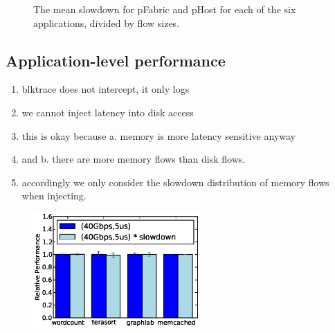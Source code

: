%
\begin{figure}
  \centering
  \caption{\small{The mean slowdown for pFabric and pHost for each of the six applications, divided by flow sizes.}}
  \label{fig:phostp}
\end{figure}
%

\subsection{Application-level performance}

\begin{enumerate}
\item blktrace does not intercept, it only logs
\item we cannot inject latency into disk access
\item this is okay because a. memory is more latency sensitive anyway 
\item and b. there are more memory flows than disk flows.
\item accordingly we only consider the slowdown distribution of memory flows when injecting.
\end{enumerate}
\label{ssec:alp}

%
\begin{figure}
  \centering
    \includegraphics[width = 2.5in]{img/slowdown.eps} 
  \caption{\small{}}
  \label{fig:appfabric}
\end{figure}
%
